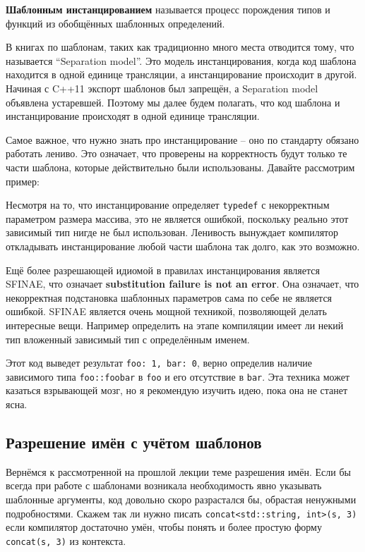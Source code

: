 \documentclass[a4paper,12pt,oneside]{article}
\begin{document}
\textbf{Шаблонным инстанцированием} называется процесс порождения типов и функций из обобщённых шаблонных определений.

В книгах по шаблонам, таких как \cite{vandervoord} традиционно много места отводится тому, что называется ``Separation model''. Это модель инстанцирования, когда код шаблона находится в одной единице трансляции, а инстанцирование происходит в другой. Начиная с C++11 \cite{stdcpp11} экспорт шаблонов был запрещён, а Separation model объявлена устаревшей. Поэтому мы далее будем полагать, что код шаблона и инстанцирование происходят в одной единице трансляции.

Самое важное, что нужно знать про инстанцирование -- оно по стандарту обязано работать лениво. Это означает, что проверены на корректность будут только те части шаблона, которые действительно были использованы. Давайте рассмотрим пример:



Несмотря на то, что инстанцирование определяет \lstinline!typedef! с некорректным параметром размера массива, это не является ошибкой, поскольку реально этот зависимый тип нигде не был использован. Ленивость вынуждает компилятор откладывать инстанцирование любой части шаблона так долго, как это возможно.

Ещё более разрешающей идиомой в правилах инстанцирования является SFINAE, что означает \textbf{substitution failure is not an error}. Она означает, что некорректная подстановка шаблонных параметров сама по себе не является ошибкой. SFINAE является очень мощной техникой, позволяющей делать интересные вещи. Например определить на этапе компиляции имеет ли некий тип вложенный зависимый тип с определённым именем.



Этот код выведет результат \lstinline!foo: 1, bar: 0!, верно определив наличие зависимого типа \lstinline!foo::foobar! в \lstinline!foo! и его отсутствие в \lstinline!bar!. Эта техника может казаться взрывающей мозг, но я рекомендую изучить идею, пока она не станет ясна.

\subsection{Разрешение имён с учётом шаблонов}

Вернёмся к рассмотренной на прошлой лекции теме разрешения имён. Если бы всегда при работе с шаблонами возникала необходимость явно указывать шаблонные аргументы, код довольно скоро разрастался бы, обрастая ненужными подробностями. Скажем так ли нужно писать \lstinline!concat<std::string, int>(s, 3)! если компилятор достаточно умён, чтобы понять и более простую форму \lstinline!concat(s, 3)! из контекста.
\end{document}
